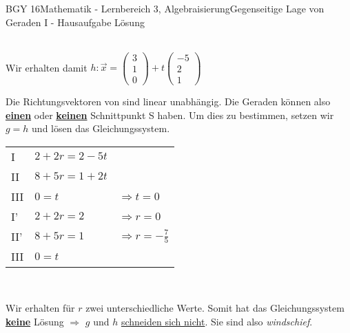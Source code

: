 \documentclass[oneside,openany,headings=optiontotoc,11pt,numbers=noenddot]{scrreprt}
\begin{document}
\begin{worksheet}{BGY 16}{Mathematik - Lernbereich 3, Algebraisierung}{Gegenseitige Lage von Geraden I - Hausaufgabe Lösung}
\begin{framed}
			\normalsize\\
			Wir erhalten damit \(h: \vec{x} = \left(\begin{array}{c}3\\1\\0\end{array}\right) + t\left(\begin{array}{c}-5\\2\\1\end{array}\right)\)\\
			\par\noindent
			Die Richtungsvektoren von sind \color{blue}linear unabhängig\normalcolor. Die Geraden können also \textbf{\underline{einen}} oder \textbf{\underline{keinen}} Schnittpunkt S haben. Um dies zu bestimmen, setzen wir \(g=h\) und lösen das Gleichungssystem.\\
			\begin{center}
				\begin{tabular}{lll}
					I & \(2 + 2r = 2 -5t\)\\
					II & \(8 +5r = 1 + 2t\) \\
					III & \(0 = t\) & \(\Rightarrow t = 0\)\\
					\hline 
					I' & \(2 + 2r = 2\) & \(\Rightarrow r = 0\)\\
					II' & \(8+5r = 1\) & \(\Rightarrow r = -\frac{7}{5}\)\\
					III & \( 0 = t\)
				\end{tabular}\\
			\end{center}
			Wir erhalten für \(r\) zwei unterschiedliche Werte. Somit hat das Gleichungssystem \textbf{\underline{keine}} Lösung \( \Rightarrow \) \(g\) und \(h\) \color{codegreen}\underline{schneiden sich nicht}\normalcolor{}. Sie sind also \textit{windschief}.
		\end{framed}
	\end{worksheet}
\end{document}

